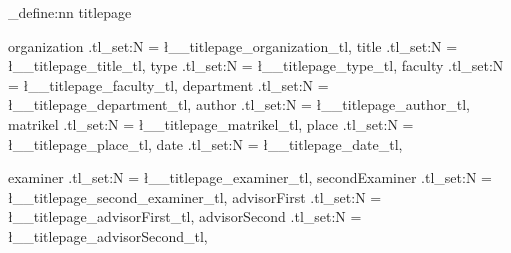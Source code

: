 \def\hlmint{\fontfamily{lmss}\fontsize{19pt}{19pt}\fontseries{b}\color{fh-mint}\selectfont}
\def\hlAbold{\fontfamily{lmss}\fontsize{14pt}{30pt}\fontseries{b}\selectfont}
\def\hlAnormal{\fontfamily{lmss}\fontsize{14pt}{14pt}\fontseries{n}\selectfont}

\newcommand{\showlogo}{


    \begin{picture}(0pt,0pt)(2cm,-2cm)
        \put(17cm,-4cm){\texttt{[image: images/fh-logo-right.png]}}
        \put(-0.5cm,-2.3cm){\texttt{[image: images/RWTH-Aachen-University.png]}}
    \end{picture}
    
}

\ExplSyntaxOn
\keys_define:nn { titlepage }
{
    organization .tl_set:N  = \l__titlepage_organization_tl,
    title  .tl_set:N  = \l__titlepage_title_tl,
    type .tl_set:N  = \l__titlepage_type_tl,
    faculty .tl_set:N  = \l__titlepage_faculty_tl,
    department .tl_set:N  = \l__titlepage_department_tl,
    author  .tl_set:N  = \l__titlepage_author_tl,
    matrikel  .tl_set:N  = \l__titlepage_matrikel_tl,
    place  .tl_set:N  = \l__titlepage_place_tl,
    date .tl_set:N  = \l__titlepage_date_tl,
    
    examiner .tl_set:N  = \l__titlepage_examiner_tl,
    secondExaminer .tl_set:N  = \l__titlepage_second_examiner_tl,
    advisorFirst .tl_set:N  = \l__titlepage_advisorFirst_tl,
    advisorSecond .tl_set:N  = \l__titlepage_advisorSecond_tl,
}

